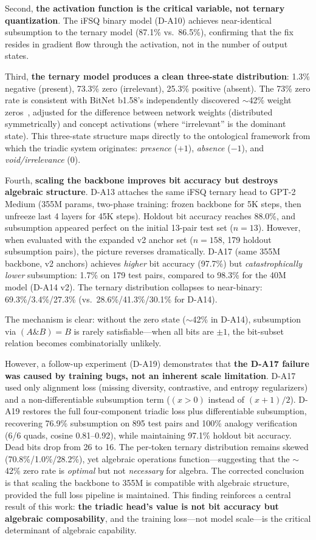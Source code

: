 \documentclass[11pt,a4paper]{article}
\begin{document}
Second, \textbf{the activation function is the critical variable, not ternary quantization}. The iFSQ binary model (D-A10) achieves near-identical subsumption to the ternary model (87.1\% vs.\ 86.5\%), confirming that the fix resides in gradient flow through the activation, not in the number of output states.

Third, \textbf{the ternary model produces a clean three-state distribution}: 1.3\% negative (present), 73.3\% zero (irrelevant), 25.3\% positive (absent). The 73\% zero rate is consistent with BitNet b1.58's independently discovered $\sim$42\% weight zeros~\citep{ma2024bitnet}, adjusted for the difference between network weights (distributed symmetrically) and concept activations (where ``irrelevant'' is the dominant state). This three-state structure maps directly to the ontological framework from which the triadic system originates: \emph{presence} ($+1$), \emph{absence} ($-1$), and \emph{void/irrelevance} ($0$).

Fourth, \textbf{scaling the backbone improves bit accuracy but destroys algebraic structure}. D-A13 attaches the same iFSQ ternary head to GPT-2 Medium (355M params, two-phase training: frozen backbone for 5K steps, then unfreeze last 4 layers for 45K steps). Holdout bit accuracy reaches 88.0\%, and subsumption appeared perfect on the initial 13-pair test set ($n=13$). However, when evaluated with the expanded v2 anchor set ($n=158$, 179 holdout subsumption pairs), the picture reverses dramatically. D-A17 (same 355M backbone, v2 anchors) achieves \emph{higher} bit accuracy (97.7\%) but \emph{catastrophically lower} subsumption: 1.7\% on 179 test pairs, compared to 98.3\% for the 40M model (D-A14 v2). The ternary distribution collapses to near-binary: 69.3\%/3.4\%/27.3\% (vs.\ 28.6\%/41.3\%/30.1\% for D-A14).

The mechanism is clear: without the zero state ($\sim$42\% in D-A14), subsumption via $(A \mathbin{\&} B) = B$ is rarely satisfiable---when all bits are $\pm 1$, the bit-subset relation becomes combinatorially unlikely.

However, a follow-up experiment (D-A19) demonstrates that \textbf{the D-A17 failure was caused by training bugs, not an inherent scale limitation}. D-A17 used only alignment loss (missing diversity, contrastive, and entropy regularizers) and a non-differentiable subsumption term ($(x > 0)$ instead of $(x+1)/2$). D-A19 restores the full four-component triadic loss plus differentiable subsumption, recovering 76.9\% subsumption on 895 test pairs and 100\% analogy verification (6/6 quads, cosine 0.81--0.92), while maintaining 97.1\% holdout bit accuracy. Dead bits drop from 26 to 16. The per-token ternary distribution remains skewed (70.8\%/1.0\%/28.2\%), yet algebraic operations function---suggesting that the $\sim$42\% zero rate is \emph{optimal} but not \emph{necessary} for algebra. The corrected conclusion is that scaling the backbone to 355M is compatible with algebraic structure, provided the full loss pipeline is maintained. This finding reinforces a central result of this work: \textbf{the triadic head's value is not bit accuracy but algebraic composability}, and the training loss---not model scale---is the critical determinant of algebraic capability.
\end{document}
